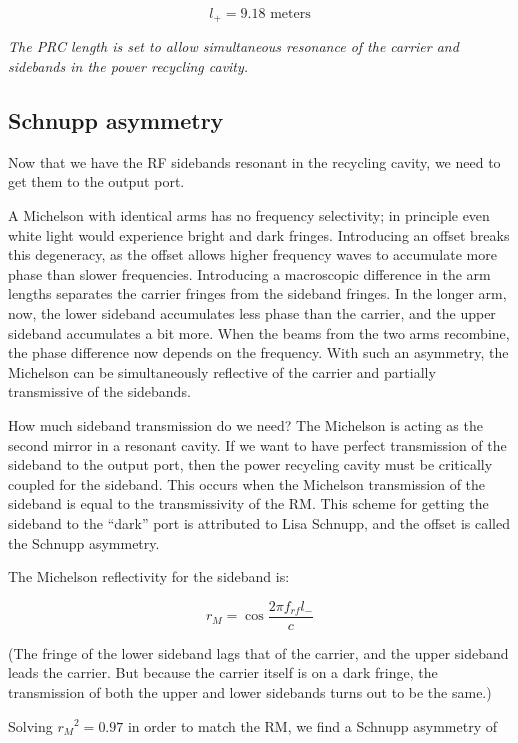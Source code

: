 \[
\boxed{{l_{+}=9.18\text{{\ meters}}}}
\]


\emph{The PRC length is set to allow simultaneous resonance of the
carrier and sidebands in the power recycling cavity.}


\subsection*{Schnupp asymmetry}

Now that we have the RF sidebands resonant in the recycling cavity,
we need to get them to the output port. 

A Michelson with identical arms has no frequency selectivity; in principle
even white light would experience bright and dark fringes. Introducing
an offset breaks this degeneracy, as the offset allows higher frequency
waves to accumulate more phase than slower frequencies. Introducing
a macroscopic difference in the arm lengths separates the carrier
fringes from the sideband fringes. In the longer arm, now, the lower
sideband accumulates less phase than the carrier, and the upper sideband
accumulates a bit more. When the beams from the two arms recombine,
the phase difference now depends on the frequency. With such an asymmetry,
the Michelson can be simultaneously reflective of the carrier and
partially transmissive of the sidebands. 

How much sideband transmission do we need? The Michelson is acting
as the second mirror in a resonant cavity. If we want to have perfect
transmission of the sideband to the output port, then the power recycling
cavity must be critically coupled for the sideband. This occurs when
the Michelson transmission of the sideband is equal to the transmissivity
of the RM. This scheme for getting the sideband to the {}``dark'' port is attributed
to Lisa Schnupp, and the offset is called the Schnupp asymmetry.

The Michelson reflectivity for the sideband is:

\begin{equation}
r_{M}=\cos\frac{2\pi f_{rf}l_{-}}{c}
\end{equation}

(The fringe of the lower sideband lags that of
the carrier, and the upper sideband leads the carrier. But because
the carrier itself is on a dark fringe, the transmission of both the
upper and lower sidebands turns out to be the same.)

Solving $r_{M}{}^{2}=0.97$ in order to match the RM, we find a Schnupp
asymmetry of

